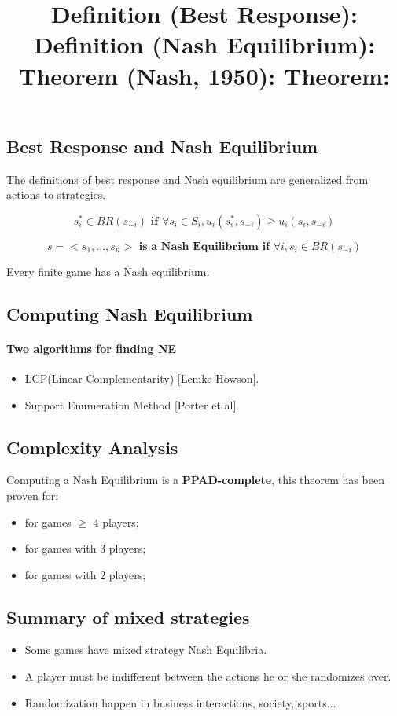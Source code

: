 \documentclass[a4paper,12pt]{article}
\begin{document}
\subsection{Best Response and Nash Equilibrium}The definitions of best response and Nash equilibrium are generalized from actions to strategies. 

\title{\textbf{Definition (Best Response):} }
$$ s_i^* \in BR(s_{-i}) \textbf{ if }   \forall s_i \in S_i, u_i(s_i^*,s_{-i}) \geq u_i(s_i, s_{-i})$$ 

\title{\textbf{Definition (Nash Equilibrium):} }
$$s = <s_1,...,s_n>\textbf{ is  a }\textbf{Nash Equilibrium if } \forall i, s_i \in BR(s_{-i})$$

\title{\textbf{Theorem (Nash, 1950)}: } Every finite game has a Nash equilibrium.
\subsection{Computing Nash Equilibrium}
\paragraph{Two algorithms for finding NE }
\begin{itemize}
\item LCP(Linear Complementarity) [Lemke-Howson].
\item Support Enumeration Method [Porter et al].
\end{itemize}
\subsection{Complexity Analysis}
\title{\textbf{Theorem:}}
Computing a Nash Equilibrium is a \textbf{PPAD-complete}, this theorem has been proven for:
\begin{itemize}
\item for games $\geq$ 4 players;
\item for games with 3 players;
\item for games with 2 players;
\end{itemize}
\subsection{Summary of mixed strategies}
\begin{itemize}
\item Some games have mixed strategy Nash Equilibria.
\item A player must be indifferent between the actions he or she randomizes over.
\item Randomization happen in business interactions, society, sports...
\end{itemize}
\end{document}
